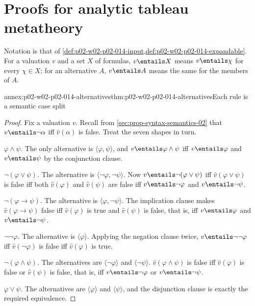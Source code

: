 \section{Proofs for analytic tableau metatheory}
\label{sec:annex-p02-w02-p02-014-tableau-metatheory}

Notation is that of \cref{def:p02-w02-p02-014-input,def:p02-w02-p02-014-expandable}.
For a valuation \(v\) and a set \(X\) of formulas, \(v\entails X\) means
\(v\entails\chi\) for every \(\chi\in X\); for an alternative \(A\),
\(v\entails A\) means the same for the members of \(A\).

\begin{annexitem}{annex:p02-w02-p02-014-alternatives}{thm:p02-w02-p02-014-alternatives}{Each rule is a semantic case split}
\begin{proof}
Fix a valuation \(v\).  Recall from \cref{sec:prop-syntax-semantics-02}
that \(v\entails\neg\alpha\) iff \(\widehat v(\alpha)\) is false.  Treat the
seven shapes in turn.

\emph{\(\varphi\land\psi\).}  The only alternative is
\(\langle\varphi,\psi\rangle\), and \(v\entails\varphi\land\psi\) iff
\(v\entails\varphi\) and \(v\entails\psi\) by the conjunction clause.

\emph{\(\neg(\varphi\lor\psi)\).}  The alternative is
\(\langle\neg\varphi,\neg\psi\rangle\).  Now \(v\entails\neg(\varphi\lor\psi)\)
iff \(\widehat v(\varphi\lor\psi)\) is false iff both \(\widehat v(\varphi)\)
and \(\widehat v(\psi)\) are false iff \(v\entails\neg\varphi\) and
\(v\entails\neg\psi\).

\emph{\(\neg(\varphi\to\psi)\).}  The alternative is
\(\langle\varphi,\neg\psi\rangle\).  The implication clause makes
\(\widehat v(\varphi\to\psi)\) false iff \(\widehat v(\varphi)\) is true and
\(\widehat v(\psi)\) is false, that is, iff \(v\entails\varphi\) and
\(v\entails\neg\psi\).

\emph{\(\neg\neg\varphi\).}  The alternative is \(\langle\varphi\rangle\).
Applying the negation clause twice, \(v\entails\neg\neg\varphi\) iff
\(\widehat v(\neg\varphi)\) is false iff \(\widehat v(\varphi)\) is true.

\emph{\(\neg(\varphi\land\psi)\).}  The alternatives are
\(\langle\neg\varphi\rangle\) and \(\langle\neg\psi\rangle\).
\(\widehat v(\varphi\land\psi)\) is false iff \(\widehat v(\varphi)\) is false
or \(\widehat v(\psi)\) is false, that is, iff \(v\entails\neg\varphi\) or
\(v\entails\neg\psi\).

\emph{\(\varphi\lor\psi\).}  The alternatives are \(\langle\varphi\rangle\)
and \(\langle\psi\rangle\), and the disjunction clause is exactly the
required equivalence.


\end{proof}
\end{annexitem}
